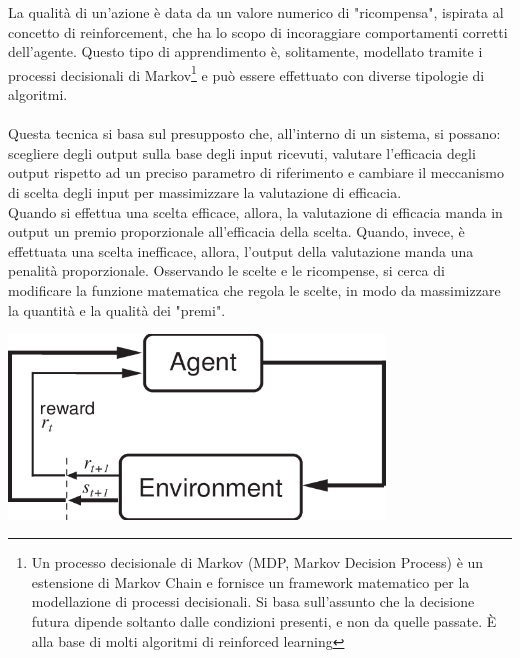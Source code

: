 \documentclass[a4paper,12pt]{report}
\begin{document}
\begin{fig}
La qualità di un'azione è data da un valore numerico di "ricompensa", ispirata al concetto di reinforcement, che ha lo scopo di incoraggiare comportamenti corretti dell'agente. Questo tipo di apprendimento è, solitamente, modellato tramite i processi decisionali di Markov\footnote{Un processo decisionale di Markov (MDP, Markov Decision Process) è un estensione di Markov Chain e fornisce un framework matematico per la modellazione di processi decisionali. Si basa sull'assunto che la decisione futura dipende soltanto dalle condizioni presenti, e non da quelle passate. È alla base di molti algoritmi di reinforced learning} e può essere effettuato con diverse tipologie di algoritmi.\\~\\
Questa tecnica si basa sul presupposto che, all'interno di un sistema, si possano: scegliere degli output sulla base degli input ricevuti, valutare l'efficacia degli output rispetto ad un preciso parametro di riferimento e cambiare il meccanismo di scelta degli input per massimizzare la valutazione di efficacia.\\
Quando si effettua una scelta efficace, allora, la valutazione di efficacia manda in output un premio proporzionale all'efficacia della scelta. Quando, invece, è effettuata una scelta inefficace, allora, l'output della valutazione manda una penalità proporzionale. Osservando le scelte e le ricompense, si cerca di modificare la funzione matematica che regola le scelte, in modo da massimizzare la quantità e la qualità dei "premi".\\

\begin{fig}
	\begin{center}
			\includegraphics[width=10cm]{rl}
	\end{center}
	\label{Figura 16}
\end{fig}


\end{fig}
\end{document}

